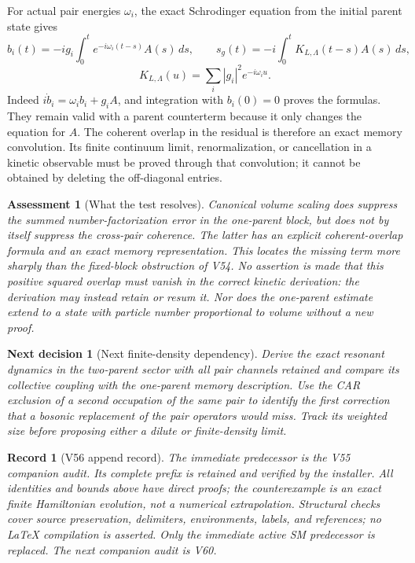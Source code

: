 \documentclass[11pt]{article}
\newtheorem{decision}[theorem]{Next decision}
\newtheorem{assessment}[theorem]{Assessment}
\newtheorem{record}[theorem]{Record}
\theoremstyle{remark}
\begin{document}
For actual pair energies \(\omega_i\), the exact Schrodinger
equation from the initial parent state gives
\[
 b_i(t)=-ig_i\int_0^t e^{-i\omega_i(t-s)}A(s)\,ds,\qquad
 s_g(t)=-i\int_0^t K_{L,\Lambda}(t-s)A(s)\,ds,
\]
\[
 K_{L,\Lambda}(u)=\sum_i|g_i|^2e^{-i\omega_i u}.
\]
Indeed \(i\dot b_i=\omega_i b_i+g_iA\), and integration
with \(b_i(0)=0\) proves the formulas.  They remain valid
with a parent counterterm because it only changes the
equation for \(A\).  The coherent overlap in the residual
is therefore an exact memory convolution.  Its finite
continuum limit, renormalization, or cancellation in a
kinetic observable must be proved through that convolution;
it cannot be obtained by deleting the off-diagonal entries.

\begin{assessment}[What the test resolves]
\label{ass:v20v56}
Canonical volume scaling does suppress the summed
number-factorization error in the one-parent block, but
does not by itself suppress the cross-pair coherence.
The latter has an explicit coherent-overlap formula and
an exact memory representation.  This locates the missing
term more sharply than the fixed-block obstruction of V54.
No assertion is made that this positive squared overlap
must vanish in the correct kinetic derivation: the derivation
may instead retain or resum it.  Nor does the one-parent
estimate extend to a state with particle number proportional
to volume without a new proof.
\end{assessment}

\begin{decision}[Next finite-density dependency]
\label{dec:v20v56-next}
Derive the exact resonant dynamics in the two-parent sector
with all pair channels retained and compare its collective
coupling with the one-parent memory description.  Use the
CAR exclusion of a second occupation of the same pair to
identify the first correction that a bosonic replacement
of the pair operators would miss.  Track its weighted size
before proposing either a dilute or finite-density limit.
\end{decision}

\begin{record}[V56 append record]
\label{rec:v20v56}
The immediate predecessor is the V55 companion audit.
Its complete prefix is retained and verified by the installer.
All identities and bounds above have direct proofs; the
counterexample is an exact finite Hamiltonian evolution,
not a numerical extrapolation.  Structural checks cover
source preservation, delimiters, environments, labels, and
references; no LaTeX compilation is asserted.  Only the
immediate active SM predecessor is replaced.
The next companion audit is V60.
\end{record}
\end{document}
